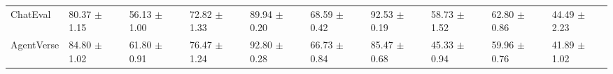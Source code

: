 \begin{table*}[htbp]
{\begin{tabular}{l|lllllllll}
ChatEval & \cellcolor{LightBlue}80.37 $\pm$ 1.15 & \cellcolor{LightRed}56.13 $\pm$ 1.00 & \cellcolor{LightBlue}72.82 $\pm$ 1.33 & \cellcolor{LightBlue}89.94 $\pm$ 0.20 & \cellcolor{LightRed}68.59 $\pm$ 0.42 & \cellcolor{LightRed}92.53 $\pm$ 0.19 & \cellcolor{LightRed}58.73 $\pm$ 1.52 & \cellcolor{LightRed}62.80 $\pm$ 0.86 & \cellcolor{LightBlue}44.49 $\pm$ 2.23 \\
AgentVerse & \cellcolor{LightRed}84.80 $\pm$ 1.02 & \cellcolor{LightRed}61.80 $\pm$ 0.91 & \cellcolor{LightBlue}76.47 $\pm$ 1.24 & \cellcolor{LightBlue}92.80 $\pm$ 0.28 & \cellcolor{LightRed}66.73 $\pm$ 0.84 & \cellcolor{LightBlue}85.47 $\pm$ 0.68 & \cellcolor{LightRed}45.33 $\pm$ 0.94 & \cellcolor{LightBlue}59.96 $\pm$ 0.76 & \cellcolor{LightBlue}41.89 $\pm$ 1.02 \\
\hline
\end{tabular}}
\end{table*}


